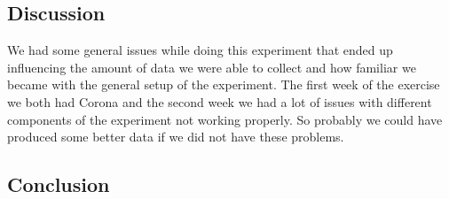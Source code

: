 \documentclass[working]{inputs/tuftebook}
\begin{document}
\subsection{Discussion}

We had some general issues while doing this experiment that ended up influencing the amount of data we were able to collect and how familiar we became with the general setup of the experiment. The first week of the exercise we both had Corona and the second week we had a lot of issues with different components of the experiment not working properly. So probably we could have produced some better data if we did not have these problems. 
\subsection{Conclusion}
\end{document}
